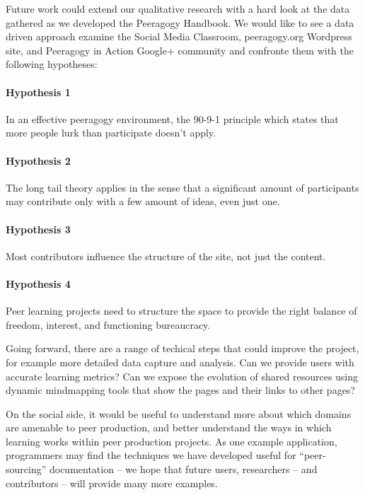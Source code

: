 \documentclass{acm_proc_article-sp}
\begin{document}
Future work could extend our qualitative research with a hard look
at the data gathered as we developed the Peeragogy Handbook.  We would
like to see a data driven approach examine the Social Media Classroom,
peeragogy.org Wordpress site, and Peeragogy in Action Google+
community and confronte them with the following hypotheses:

\paragraph{Hypothesis 1}
In an effective peeragogy environment, the 90-9-1 principle which
states that more people lurk than participate doesn't apply.

\paragraph{Hypothesis 2}
The long tail theory applies in the sense that a significant amount of
participants may contribute only with a few amount of ideas, even just
one.

\paragraph{Hypothesis 3}
Most contributors influence the structure of the site, not just the
content.

\paragraph{Hypothesis 4}
Peer learning projects need to structure the space to provide the
right balance of freedom, interest, and functioning bureaucracy.

Going forward, there are a range of techical steps that could improve
the project, for example more detailed data capture and analysis.  Can
we provide users with accurate learning metrics?  Can we expose the
evolution of shared resources using dynamic mindmapping tools that
show the pages and their links to other pages?

On the social side, it would be useful to understand more about which
domains are amenable to peer production, and better understand the
ways in which learning works within peer production projects.  As one
example application, programmers may find the techniques we have
developed useful for ``peer-sourcing'' documentation -- we hope that
future users, researchers -- and contributors -- will provide many
more examples.

\end{document}
